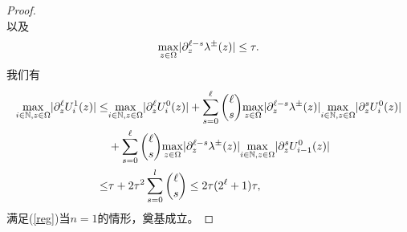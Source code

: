 \begin{proof}
\begin{equation}
  \end{equation}
  以及
  \begin{equation}
    \underset{z\in\Omega}{\max}|\partial^{\ell-s}_z \lambda^{\pm}(z)|\leq\tau.
  \end{equation}
  我们有
  \begin{equation}
    \begin{split}
      \underset{i\in\mathbb{N}, z\in\Omega}{\max}|\partial^{\ell}_z U^1_i(z)|\leq & {} \underset{i\in\mathbb{N}, z\in\Omega}{\max}|\partial^{\ell}_z U^0_i(z)| 
      + \sum_{s = 0}^\ell\binom{\ell}{s}\underset{z\in\Omega}{\max}|\partial^{\ell-s}_z \lambda^{\pm}(z)|\underset{i\in\mathbb{N}, z\in\Omega}{\max}|\partial^{s}_z U^0_i(z)|
      \\
      & {} + \sum_{s = 0}^\ell\binom{\ell}{s}\underset{z\in\Omega}{\max}|\partial^{\ell-s}_z \lambda^{\pm}(z)|\underset{i\in\mathbb{N}, z\in\Omega}{\max}|\partial^{s}_z U^0_{i-1}(z)| 
      \\
      \leq & {} \tau + 2\tau^2\sum_{s=0}^l\binom{\ell}{s}
      \leq  {} 2\tau(2^\ell + 1)\tau,
    \end{split}
  \end{equation}
  满足(\ref{reg})当$n=1$的情形，奠基成立。
  

\end{proof}
